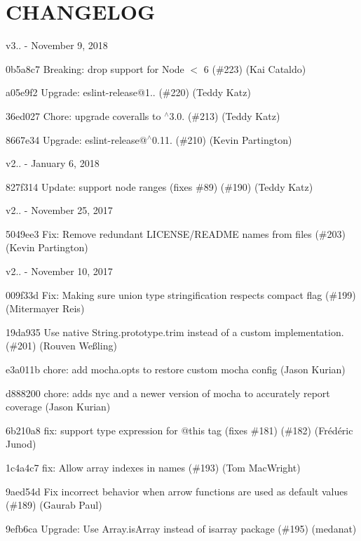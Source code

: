 \chapter{CHANGELOG}
\hypertarget{md__c_1_2_users_2alexs_2source_2repos_2_s_q_8_term_project_8my_weather_2_s_q_8_term_project_8my_d62f316ea90adf47ae454bb8c9e64a59}{}\label{md__c_1_2_users_2alexs_2source_2repos_2_s_q_8_term_project_8my_weather_2_s_q_8_term_project_8my_d62f316ea90adf47ae454bb8c9e64a59}
v3.. -\/ November 9, 2018


\begin{DoxyItemize}
\item 0b5a8c7 Breaking\+: drop support for Node \texorpdfstring{$<$}{<} 6 (\#223) (Kai Cataldo)
\item a05e9f2 Upgrade\+: eslint-\/release@1.. (\#220) (Teddy Katz)
\item 36ed027 Chore\+: upgrade coveralls to \texorpdfstring{$^\wedge$}{\string^}3.0. (\#213) (Teddy Katz)
\item 8667e34 Upgrade\+: eslint-\/release@\texorpdfstring{$^\wedge$}{\string^}0.11. (\#210) (Kevin Partington)
\end{DoxyItemize}

v2.. -\/ January 6, 2018


\begin{DoxyItemize}
\item 827f314 Update\+: support node ranges (fixes \#89) (\#190) (Teddy Katz)
\end{DoxyItemize}

v2.. -\/ November 25, 2017


\begin{DoxyItemize}
\item 5049ee3 Fix\+: Remove redundant LICENSE/\+README names from files (\#203) (Kevin Partington)
\end{DoxyItemize}

v2.. -\/ November 10, 2017


\begin{DoxyItemize}
\item 009f33d Fix\+: Making sure union type stringification respects compact flag (\#199) (Mitermayer Reis)
\item 19da935 Use native String.\+prototype.\+trim instead of a custom implementation. (\#201) (Rouven Weßling)
\item e3a011b chore\+: add mocha.\+opts to restore custom mocha config (Jason Kurian)
\item d888200 chore\+: adds nyc and a newer version of mocha to accurately report coverage (Jason Kurian)
\item 6b210a8 fix\+: support type expression for @this tag (fixes \#181) (\#182) (Frédéric Junod)
\item 1c4a4c7 fix\+: Allow array indexes in names (\#193) (Tom Mac\+Wright)
\item 9aed54d Fix incorrect behavior when arrow functions are used as default values (\#189) (Gaurab Paul)
\item 9efb6ca Upgrade\+: Use Array.\+is\+Array instead of isarray package (\#195) (medanat)
\end{DoxyItemize}

